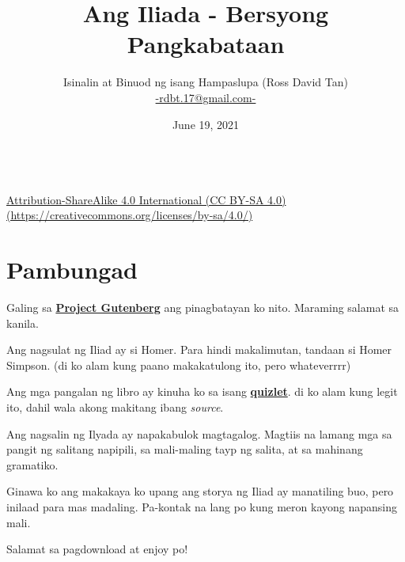 \documentclass[12pt,letterpaper]{report}
\begin{document}
\title{\textbf{Ang Iliada - Bersyong Pangkabataan}}
\author{Isinalin at Binuod ng isang Hampaslupa (Ross David Tan) \\ \href{mailto:rdbt.17@gmail.com}{-rdbt.17@gmail.com-}}
\date{June 19, 2021}
\maketitle
\pagebreak

\vspace*{\fill}
\begin{center}
    \href{https://creativecommons.org/licenses/by-sa/4.0/}{\ccbysa \\[0.5cm] Attribution-ShareAlike 4.0 International (CC BY-SA 4.0) \\ (https://creativecommons.org/licenses/by-sa/4.0/)}

\end{center}
\vspace*{\fill}

\pagebreak
\tableofcontents
\pagebreak
\setlength{\parskip}{1em}
\chapter*{Pambungad}
\begin{center}

    Galing sa \href{https://www.gutenberg.org/}{\textbf{Project Gutenberg}} ang pinagbatayan ko nito. Maraming salamat sa kanila.

    Ang nagsulat ng Iliad ay si Homer. Para hindi makalimutan, tandaan si Homer Simpson. (di ko alam kung paano makakatulong ito, pero whateverrrr)

    Ang mga pangalan ng libro ay kinuha ko sa isang \href{https://quizlet.com/24340225/titles-of-each-book-in-the-iliad-flash-cards/}{\textbf{quizlet}}.     di ko alam kung legit ito, dahil wala akong makitang ibang \textit{source}.

    Ang nagsalin ng Ilyada ay napakabulok magtagalog. Magtiis na lamang mga sa pangit ng salitang napipili, sa mali-maling tayp ng salita, at sa mahinang gramatiko.

    Ginawa ko ang makakaya ko upang ang storya ng Iliad ay manatiling buo, pero inilaad para mas madaling. Pa-kontak na lang po kung meron kayong napansing mali.

    Salamat sa pagdownload at enjoy po!
    \vspace*{\fill}
\end{center}
\pagebreak
{}
\end{document}
